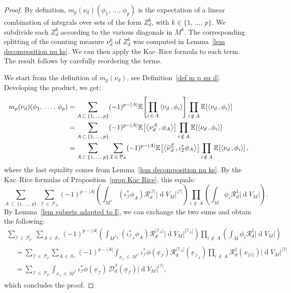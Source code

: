 \documentclass[AHL,Unicode,longabstracts,published]{cedram}
\DeclareMathOperator{\dmesure}{d}
\newcommand{\D}{\mathcal{D}}
\newcommand{\I}{\mathcal{I}}
\newcommand{\clR}{\mathcal{R}}
\newcommand{\clS}{\mathcal{S}}
\newcommand{\pa}{\mathcal{P}\!}
\newcommand{\esp}[2][]{\mathbb{E}_{#1}\!\left[#2 \right]}
\newcommand{\norm}[1]{\left\lvert #1 \right\rvert}
\newcommand{\prsc}[2]{\left\langle #1\,, #2 \right\rangle}
\newcommand{\rmes}[1]{\norm{\dmesure\! V_{#1}}}
\renewcommand{\tilde}{\widetilde}
\let\oldtilde\tilde
\renewcommand*{\tilde}[1]{\mathchoice{\widetilde{#1}}{\widetilde{#1}}{\oldtilde{#1}}{\oldtilde{#1}}}
\begin{document}
\begin{proof}
By definition, $m_p(\nu_d)(\phi_1,\,\dots,\,\phi_p)$ is the expectation of a linear combination of integrals over sets of the form $Z_d^k$, with $k \in \{1,\,\dots,\,p\}$. We subdivide each $Z_d^k$ according to the various diagonals in $M^k$. The corresponding splitting of the counting measure $\nu_d^k$ of $Z_d^k$ was computed in Lemma~\ref{lem decomposition nu ks}. We can then apply the Kac--Rice formula to each term. The result follows by carefully reordering the terms.

We start from the definition of $m_p(\nu_d)$, see Definition~\ref{def m p nu d}. Developing the product, we get:
\begin{align*}
m_p(\nu_d)(\phi_1,\,\dots,\,\phi_p) &= \sum_{A\,\subset\,\{1,\,\dots,\,p\}} (-1)^{p-\norm{A}} \esp{\prod_{i\,\in\,A} \prsc{\nu_d}{\phi_i}} \prod_{i\,\notin\,A}\esp{\prsc{\nu_d}{\phi_i}}\\
&= \sum_{A\,\subset\,\{1,\,\dots,\,p\}} (-1)^{p-\norm{A}} \esp{\prsc{\nu_d^A}{\phi_A}} \prod_{i\,\notin\,A}\esp{\prsc{\nu_d}{\phi_i}}\\
&= \sum_{A\,\subset\,\{1,\,\dots,\,p\}} \sum_{\I\,\in\,\pa_A} (-1)^{p-\norm{A}} \esp{\prsc{\tilde{\nu}_d^\I}{\iota_\I^*\phi_A}} \prod_{i\,\notin\,A}\esp{\prsc{\nu_d}{\phi_i}},
\end{align*}
where the last equality comes from Lemma~\ref{lem decomposition nu ks}. By the Kac--Rice formulas of Proposition~\ref{prop Kac Rice}, this equals:
\[
\sum_{A\,\subset\,\{1,\,\dots,\,p\}}\;\sum_{\I\,\in\,\pa_A} (-1)^{p-\norm{A}} \left(\int_{M^\I} \left(\iota_\I^*\phi_A\right) \clR_d^{\norm{\I}} \rmes{M}^{\norm{\I}}\right) \prod_{i \,\notin\,A} \left(\int_M \phi_i \clR_d^1 \rmes{M}\right).
\]
By Lemma~\ref{lem subsets adapted to I}, we can exchange the two sums and obtain the following:
\begin{multline*}
\sum_{\I\,\in\,\pa_p}\;\sum_{A\,\in\,\clS_\I} (-1)^{p-\norm{A}} \left(\int_{M^{\I_A}} \left(\iota_{\I_A}^*\phi_A\right) \clR_d^{\norm{\I_A}} \rmes{M}^{\norm{\I_A}}\right) \prod_{i\,\notin\,A} \left(\int_M \phi_i \clR_d^1 \rmes{M}\right)\\
\begin{aligned}
&= \sum_{\I\,\in\,\pa_p} \sum_{A\,\in\,\clS_\I} (-1)^{p-\norm{A}} \int_{\underline{x}_\I\,\in\,M^\I} \iota_\I^*\phi\left(\underline{x}_\I\right) \clR_d^{\norm{\I_A}}\left(\underline{x}_{\I_A}\right) \prod_{i\,\notin\,A} \clR_d^1\left(x_{\{i\}}\right) \rmes{M}^{\norm{\I}}\\
&= \sum_{\I\,\in\,\pa_p} \int_{\underline{x}_\I\,\in\,M^\I} \iota_\I^*\phi\left(\underline{x}_\I\right)\,\D_d^\I\left(\underline{x}_\I\right) \rmes{M}^{\norm{\I}},
\end{aligned}
\end{multline*}
which concludes the proof.
\end{proof}
\end{document}

